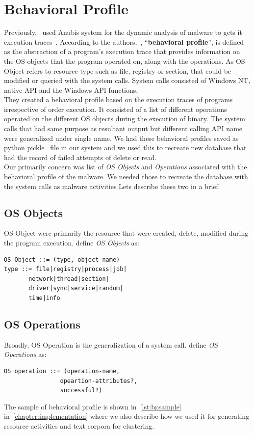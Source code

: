 \section{Behavioral Profile}
\label{sec:Behavioral Profile}
Previously,~\citeauthor{bayer} used Anubis system for the dynamic analysis of malware to gets it execution traces~\cite[]{bayer}.
According to the authors,~\citeauthor{bayer}, ``\textbf{behavioral profile}'', is defined as the abstraction of a program's execution trace that provides information on the OS objects that the program operated on, along with the operations.
As OS Object refers to resource type such as file, registry or section, that could be modified or queried with the system calls.
System calls consisted of Windows NT, native API and the Windows API functions.\\
They created a behavioral profile based on the execution traces of programs irrespective of order execution.
It consisted of a list of different operations operated on the different OS objects during the execution of binary.
The system calls that had same purpose as resultant output but different calling API name were generalized under single name.
We had these behavioral profiles saved as python pickle~\cite[]{pythonpickle} file in our system and we used this to recreate new database that had the record of failed attempts of delete or read.
\\
Our primarily concern was list of \emph{OS Objects} and \emph{Operations} associated with the behavioral profile of the malware.
We needed those to recreate the database with the system calls as malware activities 
Lets describe these two in a brief.
\subsection{OS Objects}
\label{sub:OS Objects}
OS Object were primarily the resource that were created, delete, modified during the program execution.
\citeauthor{bayer} define \emph{OS Objects} as:
\begin{lstlisting}
OS Object ::= (type, object-name)
type ::= file|registry|process|job|
       network|thread|section|
       driver|sync|service|random|
       time|info
\end{lstlisting}
\subsection{OS Operations}
\label{sub:OS Operations}
Broadly, OS Operation is the generalization of a system call.
\citeauthor{bayer} define \emph{OS Operations} as:
\begin{lstlisting}
OS operation ::= (operation-name,
                opeartion-attributes?,
                successful?)
\end{lstlisting}
The sample of behavioral profile is shown in~\autoref{lst:bpsample} in~\autoref{chapter:implementation} where we also describe how we used it for generating resource activities and text corpora for clustering.

